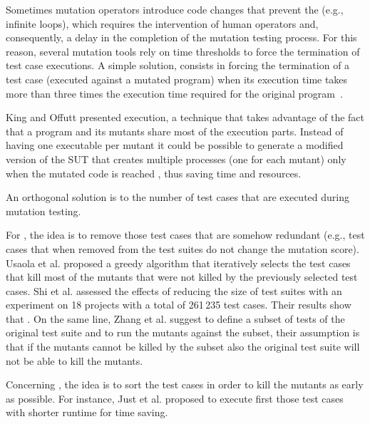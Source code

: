 Sometimes mutation operators introduce code changes that prevent the  (e.g., infinite loops), which requires the intervention of human operators and, consequently, a delay in the completion of the mutation testing process.
For this reason, several mutation tools rely on time thresholds to force the termination of test case executions. 
A simple solution, consists in forcing the termination of a test case (executed against a mutated program) when its execution time  takes more than three times the execution time required for the original program~\cite{papadakis2019mutation}.

King and Offutt \cite{king1991fortran} presented  execution, a technique that takes advantage of the fact that a program and its mutants share most of the execution parts. Instead of having one executable per mutant it could be possible to generate a modified version of the SUT that creates multiple processes (one for each mutant) only when the mutated code is reached \cite{tokumoto2016muvm}, thus saving time and resources. 

An orthogonal solution is to  the number of test cases that are executed during mutation testing.

For , the idea is to remove those test cases that are somehow redundant (e.g., test cases that when removed from the test suites do not change the mutation score).
Usaola et al. \cite{usaola2012reduction} proposed a greedy algorithm that iteratively selects  the test cases that kill most of the mutants that were not killed by the previously selected test cases. 
Shi et al. \cite{shi2014balancing} assessed the effects of reducing the size of test suites with an experiment on 18 projects with a total of 261\,235 test cases. Their results show that . 
On the same line, Zhang et al. \cite{zhang2013faster} suggest to define a subset of tests of the original test suite and to run the mutants against the subset, their assumption is that if the mutants cannot be killed by the subset also the original test suite will not be able to kill the mutants.

Concerning , the idea is to sort the test cases in order to kill the mutants as early as possible. For instance, Just et al. \cite{just2012using} proposed to execute first those test cases with shorter runtime for time saving.

